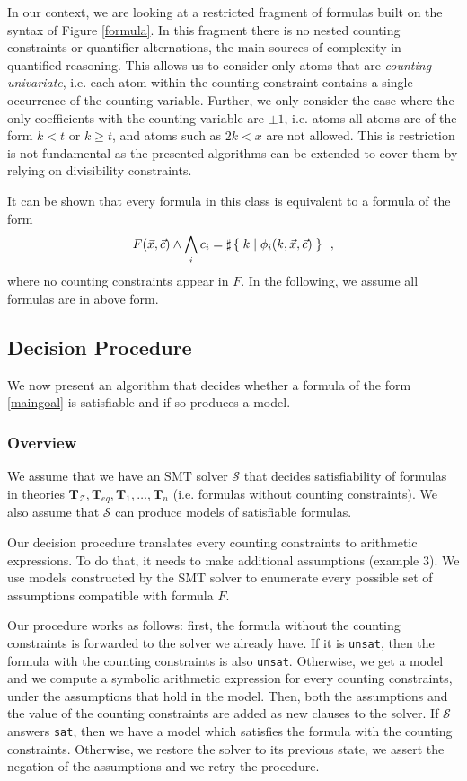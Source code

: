 In our context, we are looking at a restricted fragment of formulas
built on the syntax of Figure \ref{formula}. In this fragment there is
no nested counting constraints or quantifier alternations, the main
sources of complexity in quantified reasoning. This allows us to
consider only atoms that are \emph{counting-univariate}, i.e. each
atom within the counting constraint contains a single occurrence of
the counting variable. Further, we only consider the case where the
only coefficients with the counting variable are $\pm 1$, i.e. atoms
all atoms are of the form $k < t$ or $k \geq t$, and atoms such as $2k <
x$ are not allowed. This is restriction is not fundamental as the
presented algorithms can be extended to cover them by relying on
divisibility constraints.

It can be shown that every formula in this class is equivalent to a
formula of the form
\begin{equation}
F(\vec{x}, \vec{c}) \land \bigwedge_i c_i = \sharp\left\lbrace\;k\;|\;\phi_i(k, \vec{x}, \vec{c})\;\right\rbrace\enspace,
\label{maingoal}
\end{equation}
where no counting constraints appear in $F$. In the following, we
assume all formulas are in above form.

\subsection{Decision Procedure}

We now present an algorithm that decides whether a formula of the form
\ref{maingoal} is satisfiable and if so produces a model.

\subsubsection{Overview}

We assume that we have an SMT solver $\mathcal{S}$ that decides satisfiability
of formulas in theories $\mathbf{T}_\mathcal{Z}, \mathbf{T}_{eq}, \mathbf{T}_1, \ldots,
\mathbf{T}_n$ (i.e. formulas
without counting constraints). We also assume that $\mathcal{S}$ can produce
models of satisfiable formulas.

Our decision procedure translates every counting constraints to arithmetic expressions. To do that, it needs
to make additional assumptions (example 3). We use models constructed by the SMT solver to enumerate every possible set of
assumptions compatible with formula $F$.

Our procedure works as follows: first, the formula without the counting constraints is forwarded to
the solver we already have. If it is \texttt{unsat}, then the formula with the counting constraints is also
\texttt{unsat}. Otherwise, we get a model and we compute a symbolic arithmetic expression for every counting
constraints, under the assumptions that hold in the model. Then, both the assumptions and the value
of the counting constraints are added as new clauses to the solver. If $\mathcal{S}$ answers \texttt{sat}, then we
have a model which satisfies the formula with the counting constraints. Otherwise, we restore the
solver to its previous state, we assert the negation of the assumptions and we
retry the procedure.

